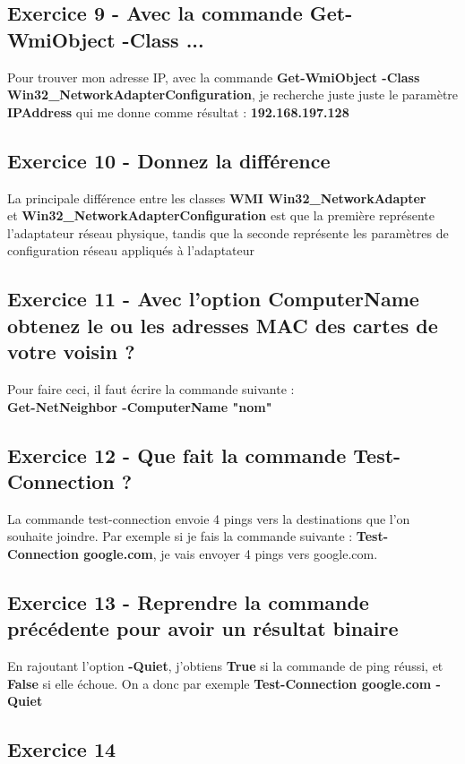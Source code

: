 \documentclass[12pt, a4paper]{article}
\begin{document}
\subsection{Exercice 9 - Avec la commande Get-WmiObject -Class ...}
Pour trouver mon adresse IP, avec la commande \textbf{Get-WmiObject -Class Win32\_NetworkAdapterConfiguration}, 
je recherche juste juste le paramètre \textbf{IPAddress} qui me donne comme résultat : \textbf{192.168.197.128}

\subsection{Exercice 10 - Donnez la différence}
La principale différence entre les classes \textbf{WMI Win32\_NetworkAdapter} \\et 
\textbf{Win32\_NetworkAdapterConfiguration} est que la première représente l'adaptateur 
réseau physique, tandis que la seconde représente les paramètres de 
configuration réseau appliqués à l'adaptateur

\subsection{Exercice 11 - Avec l’option ComputerName obtenez le ou les adresses MAC des cartes de votre voisin ?}
Pour faire ceci, il faut écrire la commande suivante :\\
\textbf{Get-NetNeighbor -ComputerName "nom"}

\subsection{Exercice 12 - Que fait la commande Test-Connection ?}
La commande test-connection envoie 4 pings vers la destinations que l'on
souhaite joindre. Par exemple si je fais la commande suivante :
\textbf{Test-Connection google.com}, je vais envoyer 4 pings vers
google.com.\\

\subsection{Exercice 13 - Reprendre la commande précédente pour avoir un résultat binaire}
En rajoutant l'option \textbf{-Quiet}, j'obtiens \textbf{True} si la commande
de ping réussi, et \textbf{False} si elle échoue. On a donc par exemple 
\textbf{Test-Connection google.com -Quiet}

\subsection{Exercice 14}
\end{document}
